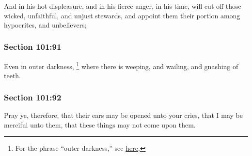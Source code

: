 		And in his hot displeasure, and in his fierce anger, in his time, will cut off those wicked, unfaithful, and unjust stewards, and appoint them their portion among hypocrites, and unbelievers;


	\subsubsection{Section 101:91} %
		\label{DC101-91}

		Even in outer darkness,%
			\footnote{%
				For the phrase ``outer darkness,'' see \hyperref[DARKNESS-PHRASES]{here}.
				}
		where there is weeping, and wailing, and gnashing of teeth.


	\subsubsection{Section 101:92} %
		\label{DC101-92}

		Pray ye, therefore, that their ears may be opened unto your cries, that I may be merciful unto them, that these things may not come upon them.


